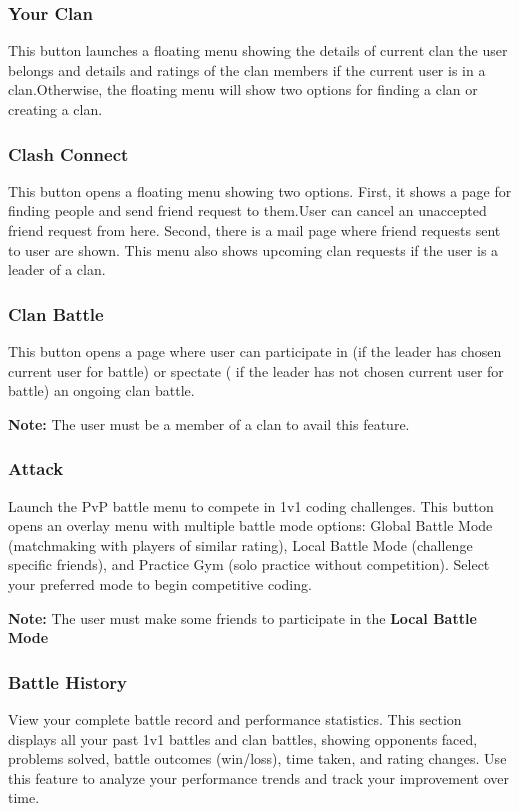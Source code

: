 \documentclass[12pt]{article}
\begin{document}
\subsubsection{Your Clan}
This button launches a floating menu showing the details of current clan the user belongs and details and ratings of the clan members if the current user is in a clan.Otherwise, the floating menu will show two options for finding a clan or creating a clan.
\subsubsection{Clash Connect}
This button opens a floating menu showing two options. First, it shows a page for finding people and send friend request to them.User can cancel an unaccepted friend request from here. Second, there is a mail page where friend requests sent to user are shown. This menu also shows upcoming clan requests if the user is a leader of a clan.
\subsubsection{Clan Battle}
This button opens a page where user can participate in (if the leader has chosen current user for battle) or spectate ( if the leader has not chosen current user for battle) an ongoing clan battle.
\begin{tcolorbox}
\textbf{Note: }The user must be a member of a clan to avail this feature.
\end{tcolorbox}
\subsubsection{Attack}
Launch the PvP battle menu to compete in 1v1 coding challenges. This button opens an overlay menu with multiple battle mode options: Global Battle Mode (matchmaking with players of similar rating), Local Battle Mode (challenge specific friends), and Practice Gym (solo practice without competition). Select your preferred mode to begin competitive coding.
\begin{tcolorbox}
\textbf{Note: }The user must make some friends to participate in the \textbf{Local Battle Mode}
\end{tcolorbox}
\subsubsection{Battle History}
View your complete battle record and performance statistics. This section displays all your past 1v1 battles and clan battles, showing opponents faced, problems solved, battle
outcomes (win/loss), time taken, and rating changes. Use this feature to analyze your performance trends and track your improvement over time.
\end{document}
